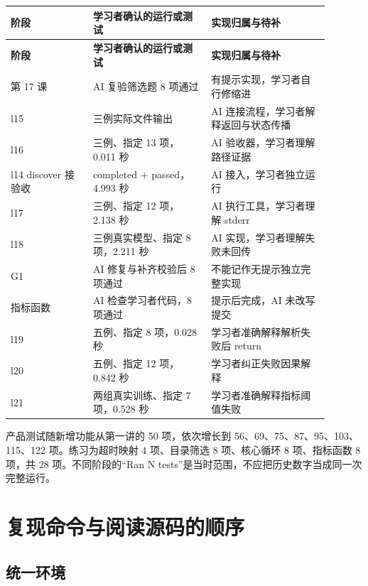 \documentclass[UTF8,zihao=-4,fontset=fandol]{ctexart}
\begin{document}
{\small\setlength{\tabcolsep}{4pt}
\renewcommand{\arraystretch}{1.25}
\begin{longtable}{>{\raggedright\arraybackslash}p{0.23\linewidth}>{\raggedright\arraybackslash}p{0.33\linewidth}>{\raggedright\arraybackslash}p{0.33\linewidth}}
\toprule
\textbf{阶段} & \textbf{学习者确认的运行或测试} & \textbf{实现归属与待补} \\
\midrule\endfirsthead
\toprule
\textbf{阶段} & \textbf{学习者确认的运行或测试} & \textbf{实现归属与待补} \\
\midrule\endhead
\bottomrule\endfoot
第 17 课 & AI 复验筛选题 8 项通过 & 有提示实现，学习者自行修缩进 \\
l15 & 三例实际文件输出 & AI 连接流程，学习者解释返回与状态传播 \\
l16 & 三例、指定 13 项，0.011 秒 & AI 验收器，学习者理解路径证据 \\
l14 discover 接验收 & completed + passed，4.993 秒 & AI 接入，学习者独立运行 \\
l17 & 三例、指定 12 项，2.138 秒 & AI 执行工具，学习者理解 stderr \\
l18 & 三例真实模型、指定 8 项，2.211 秒 & AI 实现，学习者理解失败未回传 \\
G1 & AI 修复与补齐校验后 8 项通过 & 不能记作无提示独立完整实现 \\
指标函数 & AI 检查学习者代码，8 项通过 & 提示后完成，AI 未改写提交 \\
l19 & 五例、指定 8 项，0.028 秒 & 学习者准确解释解析失败后 return \\
l20 & 五例、指定 12 项，0.842 秒 & 学习者纠正失败因果解释 \\
l21 & 两组真实训练、指定 7 项，0.528 秒 & 学习者准确解释指标阈值失败 \\
\end{longtable}}

产品测试随新增功能从第一讲的 50 项，依次增长到 56、69、75、87、95、103、115、122 项。练习为超时映射 4 项、目录筛选 8 项、核心循环 8 项、指标函数 8 项，共 28 项。不同阶段的“Ran N tests”是当时范围，不应把历史数字当成同一次完整运行。

\section{复现命令与阅读源码的顺序}

\subsection{统一环境}
\end{document}

